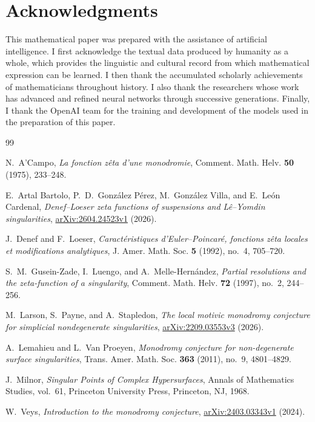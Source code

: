 \documentclass[11pt]{article}
\numberwithin{equation}{section}
\theoremstyle{definition}
\theoremstyle{remark}
\begin{document}
\section*{Acknowledgments}

This mathematical paper was prepared with the assistance of artificial intelligence.  I
first acknowledge the textual data produced by humanity as a whole, which
provides the linguistic and cultural record from which mathematical expression
can be learned.  I then thank the accumulated scholarly achievements of
mathematicians throughout history.  I also thank the researchers whose work has
advanced and refined neural networks through successive generations.  Finally,
I thank the OpenAI team for the training and development of the models used in
the preparation of this paper.

\begin{thebibliography}{99}

N.~A'Campo,
\emph{La fonction z\^eta d'une monodromie},
Comment. Math. Helv. \textbf{50} (1975), 233--248.

E.~Artal Bartolo, P.~D.~Gonz\'alez P\'erez,
M.~Gonz\'alez Villa, and E.~Le\'on Cardenal,
\emph{Denef--Loeser zeta functions of suspensions and
L\^e--Yomdin singularities},
\href{https://arxiv.org/abs/2604.24523v1}{arXiv:2604.24523v1}
(2026).

J.~Denef and F.~Loeser,
\emph{Caract\'eristiques d'Euler--Poincar\'e, fonctions z\^eta
locales et modifications analytiques},
J. Amer. Math. Soc. \textbf{5} (1992), no.~4, 705--720.

S.~M.~Gusein-Zade, I.~Luengo, and A.~Melle-Hern\'andez,
\emph{Partial resolutions and the zeta-function of a singularity},
Comment. Math. Helv. \textbf{72} (1997), no.~2, 244--256.

M.~Larson, S.~Payne, and A.~Stapledon,
\emph{The local motivic monodromy conjecture for simplicial
nondegenerate singularities},
\href{https://arxiv.org/abs/2209.03553v3}{arXiv:2209.03553v3}
(2026).

A.~Lemahieu and L.~Van Proeyen,
\emph{Monodromy conjecture for non-degenerate surface singularities},
Trans. Amer. Math. Soc. \textbf{363} (2011), no.~9, 4801--4829.

J.~Milnor,
\emph{Singular Points of Complex Hypersurfaces},
Annals of Mathematics Studies, vol.~61,
Princeton University Press, Princeton, NJ, 1968.

W.~Veys,
\emph{Introduction to the monodromy conjecture},
\href{https://arxiv.org/abs/2403.03343v1}{arXiv:2403.03343v1}
(2024).

\end{thebibliography}
\end{document}
